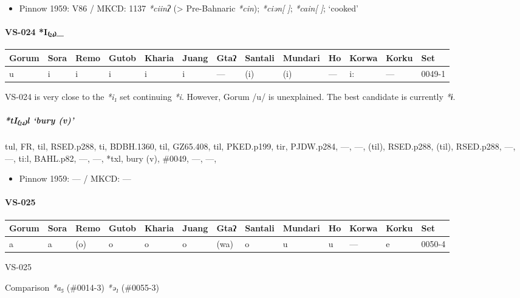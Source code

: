 \documentclass[a4paper,]{article}
\providecommand{\tightlist}{%
  \setlength{\itemsep}{0pt}\setlength{\parskip}{0pt}}
\let\oldparagraph\paragraph
\renewcommand{\paragraph}[1]{\oldparagraph{#1}\mbox{}}
\let\oldsubparagraph\subparagraph
\renewcommand{\subparagraph}[1]{\oldsubparagraph{#1}\mbox{}}
\begin{document}
\begin{itemize}
\tightlist
\item
  Pinnow 1959: V86 / MKCD: 1137 \emph{*ciinʔ} (\textgreater{}
  Pre-Bahnaric \emph{*cin}); \emph{*ciən{[} {]}}; \emph{*cain{[} {]}};
  `cooked'
\end{itemize}

\paragraph{VS-024 *I₍₂₄₎\_}\label{vs-024-i_}

\begin{longtable}[]{@{}lllllllllllll@{}}
\toprule
Gorum & Sora & Remo & Gutob & Kharia & Juang & Gtaʔ & Santali & Mundari
& Ho & Korwa & Korku & Set\tabularnewline
\midrule
\endhead
u & i & i & i & i & i & --- & (i) & (i) & --- & i: & --- &
0049-1\tabularnewline
\bottomrule
\end{longtable}

VS-024 is very close to the \emph{*i₁} set continuing \emph{*i}.
However, Gorum /u/ is unexplained. The best candidate is currently
\emph{*ɨ}.

\subparagraph{\texorpdfstring{\emph{*tI₍₂₄₎l} `bury
(v)'}{*tI₍₂₄₎l bury (v)}}\label{til-bury-v}

tul, FR, til, RSED.p288, ti, BDBH.1360, til, GZ65.408, til, PKED.p199,
tir, PJDW.p284, ---, ---, (til), RSED.p288, (til), RSED.p288, ---, ---,
ti:l, BAHL.p82, ---, ---, *txl, bury (v), \#0049, ---, ---,

\begin{itemize}
\tightlist
\item
  Pinnow 1959: --- / MKCD: ---
\end{itemize}

\paragraph{VS-025}\label{vs-025}

\begin{longtable}[]{@{}lllllllllllll@{}}
\toprule
Gorum & Sora & Remo & Gutob & Kharia & Juang & Gtaʔ & Santali & Mundari
& Ho & Korwa & Korku & Set\tabularnewline
\midrule
\endhead
a & a & (o) & o & o & o & (wa) & o & u & u & --- & e &
0050-4\tabularnewline
\bottomrule
\end{longtable}

VS-025

Comparison \emph{*a₅} (\#0014-3) \emph{*ə₁} (\#0055-3)
\end{document}
